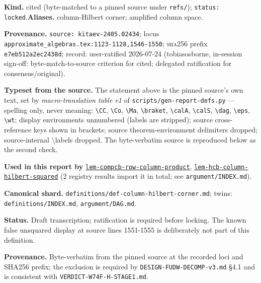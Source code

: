 \begin{defnote}
\textbf{Kind.} cited (byte-matched to a pinned source under \texttt{refs/}); \texttt{status: locked}.\quad\textbf{Aliases.} column-Hilbert corner; amplified column space.
\par
\textbf{Provenance.} \texttt{source: kitaev-\allowbreak{}2405.\allowbreak{}02434}; locus \texttt{approximate\_algebras.\allowbreak{}tex:\allowbreak{}1123-\allowbreak{}1128,\allowbreak{}1546-\allowbreak{}1550}; \textsc{sha256} prefix \texttt{e7eb512a2ec2438d}; record: user-\allowbreak{}ratified 2026-\allowbreak{}07-\allowbreak{}24 (tobiasosborne,\allowbreak{} in-\allowbreak{}session sign-\allowbreak{}off:\allowbreak{} byte-\allowbreak{}match-\allowbreak{}to-\allowbreak{}source criterion for cited;\allowbreak{} delegated ratification for consensus/\allowbreak{}original).
\par
\textbf{Typeset from the source.} The statement above is the pinned source's own text, set by \emph{macro-translation table v1} of \texttt{scripts/gen-report-defs.py} --- spelling only, never meaning: \texttt{\textbackslash{}CC}, \texttt{\textbackslash{}Co}, \texttt{\textbackslash{}Ma}, \texttt{\textbackslash{}braket}, \texttt{\textbackslash{}calA}, \texttt{\textbackslash{}calS}, \texttt{\textbackslash{}dag}, \texttt{\textbackslash{}eps}, \texttt{\textbackslash{}wt}; display environments unnumbered (labels are stripped); source cross-reference keys shown in brackets; source theorem-environment delimiters dropped; source-internal \textbackslash{}labels dropped. The byte-verbatim source is reproduced below as the second check.
\par
\textbf{Used in this report by} \hyperref[lem:compcb-row-column-product]{\texttt{lem-\allowbreak{}compcb-\allowbreak{}row-\allowbreak{}column-\allowbreak{}product}}, \hyperref[lem:hcb-column-hilbert-squared]{\texttt{lem-\allowbreak{}hcb-\allowbreak{}column-\allowbreak{}hilbert-\allowbreak{}squared}} (2 registry results import it in total; see \texttt{argument/INDEX.md}).
\par
\textbf{Canonical shard.} \texttt{definitions/\allowbreak{}def-\allowbreak{}column-\allowbreak{}hilbert-\allowbreak{}corner.\allowbreak{}md}; twins: \texttt{definitions/INDEX.md}, \texttt{argument/DAG.md}.
\par
\textbf{Status.} Draft transcription; ratification is required before locking. The
known false unsquared display at source lines 1551-1555 is deliberately not
part of this definition.

\textbf{Provenance.} Byte-verbatim from the pinned source at the recorded loci
and SHA256 prefix; the exclusion is required by \texttt{DESIGN-\allowbreak{}FUDW-\allowbreak{}DECOMP-\allowbreak{}v3.\allowbreak{}md}
\S{}4.1 and is consistent with \texttt{VERDICT-\allowbreak{}W74F-\allowbreak{}H-\allowbreak{}STAGE1.\allowbreak{}md}.
\end{defnote}
